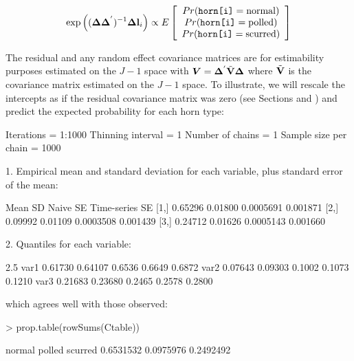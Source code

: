 \documentclass{article}
\begin{document}
\begin{equation}
\textrm{exp}\left(({\bm \Delta}{\bm \Delta}^{'})^{-1}{\bm \Delta}{\bf l}_{i}\right) \propto E\left[\begin{array}{c} Pr(\texttt{horn[i]}=\textrm{normal})\\ Pr(\texttt{horn[i]}=\textrm{polled})\\ Pr(\texttt{horn[i]}=\textrm{scurred}) \end{array} \right]
\end{equation}

The residual and any random effect covariance matrices are for estimability purposes estimated on the $J-1$ space with  ${\bm V}={\bm \Delta}^{'}\tilde{\bf V}{\bm \Delta}$ where $\tilde{\bf V}$ is the covariance matrix estimated on the $J-1$ space. To illustrate, we will rescale the intercepts as if the residual covariance matrix was zero (see Sections and \label{pred-sec} \label{cat-sec}) and predict the expected probability for each horn type:

\begin{Schunk}
\begin{Soutput}
Iterations = 1:1000
Thinning interval = 1 
Number of chains = 1 
Sample size per chain = 1000 

1. Empirical mean and standard deviation for each variable,
   plus standard error of the mean:

        Mean      SD  Naive SE Time-series SE
[1,] 0.65296 0.01800 0.0005691       0.001871
[2,] 0.09992 0.01109 0.0003508       0.001439
[3,] 0.24712 0.01626 0.0005143       0.001660

2. Quantiles for each variable:

        2.5%
var1 0.61730 0.64107 0.6536 0.6649 0.6872
var2 0.07643 0.09303 0.1002 0.1073 0.1210
var3 0.21683 0.23680 0.2465 0.2578 0.2800
\end{Soutput}
\end{Schunk}

which agrees well with those observed:

\begin{Schunk}
\begin{Sinput}
> prop.table(rowSums(Ctable))
\end{Sinput}
\begin{Soutput}
   normal    polled   scurred 
0.6531532 0.0975976 0.2492492 
\end{Soutput}
\end{Schunk}
\end{document}
